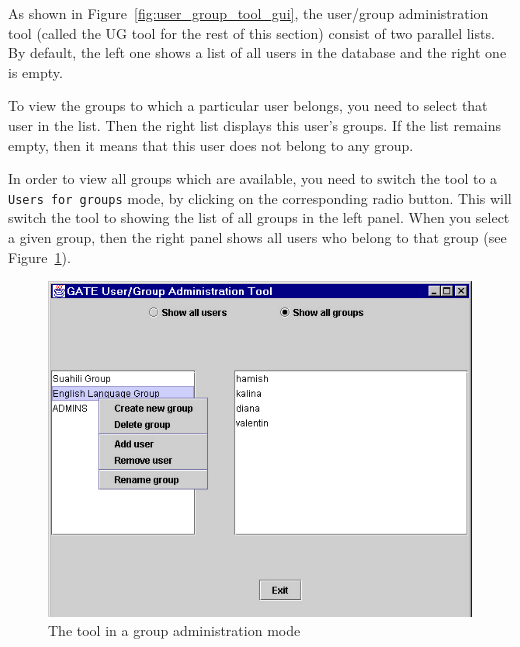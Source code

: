 
As shown in Figure~\ref{fig:user_group_tool_gui}, the user/group
administration tool (called the UG tool for the rest of this section)
consist of two parallel lists. By default, the left one shows a list of
all users in the database and the right one is empty.

To view the groups to which a particular user belongs, you need to
select that user in the list. Then the right list displays this user's
groups. If the list remains empty, then it means that this user does not
belong to any group.

In order to view all groups which are available, you need to switch the
tool to a {\tt Users for groups} mode, by clicking on the corresponding
radio button. This will switch the tool to showing the list of all
groups in the left panel. When you select a given group, then the right
panel shows all users who belong to that group (see
Figure~\ref{fig:user_group_tool_group_mode}).
%
\begin{figure}[htbp]
\begin{center}
\includegraphics[scale=0.5]{user-group-tool-group-mode.png}
\end{center}
\caption{The tool in a group administration mode}
\label{fig:user_group_tool_group_mode}
\end{figure}
%


